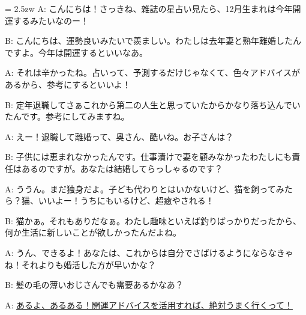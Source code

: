 \documentclass[11pt]{amsart}
\title{}
\author{}
\newenvironment{hangall}[1]{\hangindent = 2.5zw\everypar{\hangindent = 2.5zw}}{}
\begin{document}
\maketitle
\begin{hangall}{}%
A: こんにちは！さっきね、雑誌の星占い見たら、12月生まれは今年開運するみたいなのー！

B: こんにちは、運勢良いみたいで羨ましい。わたしは去年妻と熟年離婚したんですよ。今年は開運するといいなあ。

A: それは辛かったね。占いって、予測するだけじゃなくて、色々アドバイスがあるから、参考にするといいよ！

B: 定年退職してさぁこれから第二の人生と思っていたからかなり落ち込んでいたんです。参考にしてみますね。

A: えー！退職して離婚って、奥さん、酷いね。お子さんは？

B: 子供には恵まれなかったんです。仕事漬けで妻を顧みなかったわたしにも責任はあるのですが。あなたは結婚してらっしゃるのです？

A: ううん。まだ独身だよ。子ども代わりとはいかないけど、猫を飼ってみたら？猫、いいよー！うちにもいるけど、超癒やされる！

B: 猫かぁ。それもありだなぁ。わたし趣味といえば釣りばっかりだったから、何か生活に新しいことが欲しかったんだよね。

A: うん、できるよ！あなたは、これからは自分でさばけるようにならなきゃね！それよりも婚活した方が早いかな？

B: 髪の毛の薄いおじさんでも需要あるかなあ？

A: \ul{あるよ、あるある！開運アドバイスを活用すれば、絶対うまく行くって！}\end{hangall}
\end{document}
